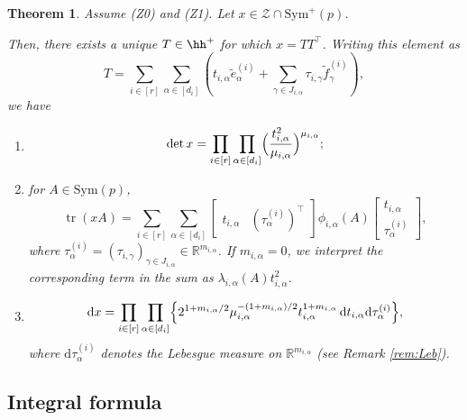 \documentclass[12pt]{amsart}
\theoremstyle{plain}
\newtheorem{theorem}{Theorem}[section]
\theoremstyle{definition}
\theoremstyle{remark}
\newcommand{\R}{\mathbb{R}}
\newcommand{\1}{\mathbf{1}}
\newcommand{\dd}{\mathrm{d}}
\newcommand{\tr}{\operatorname{tr}}
\newcommand{\mytransp}[1]{ #1^{\top}}
\begin{document}
\begin{theorem}\label{thm:new_Cholesky}
    Assume (Z0) and (Z1).  
Let $x \in \mathcal{Z} \cap \mathrm{Sym}^+(p)$.

Then, there exists a unique $T \in \hh^+$ for which $x = T \mytransp{T}$.
Writing this element as
\[
T = \sum_{i\in[r]} \sum_{\alpha\in[d_i]} (t_{i,\alpha} \tilde{e}^{(i)}_\alpha + \sum_{\gamma \in J_{i,\alpha}} \tau_{i,\gamma} \tilde{f}^{(i)}_\gamma ),
\]
we have 
\begin{enumerate}
    \item[(i)]    
\begin{align*}
  \det x
 = \prod_{i\in[r]} \prod_{\alpha\in[d_i]} 
 \Bigl( \frac{t_{i,\alpha}^2} {\mu_{i,\alpha} } \Bigr)^{\mu_{i,\alpha}};
    \end{align*}
    \item[(ii)] for $A\in\mathrm{Sym}(p)$, 
\begin{equation*}
 \tr(xA) =
\sum_{i\in[r]} \sum_{\alpha\in[d_i]} 
\begin{bmatrix} t_{i,\alpha} & (\tau_{\alpha}^{(i)})^\top \end{bmatrix}
\phi_{i,\alpha}(A)
\begin{bmatrix} t_{i,\alpha} \\ \tau_{\alpha}^{(i)} \end{bmatrix},
\end{equation*}
where $\tau_{\alpha}^{(i)}=(\tau_{i,\gamma})_{\gamma\in J_{i,\alpha}}\in \R^{m_{i,\alpha}}$.
If $m_{i,\alpha}=0$, we interpret the corresponding term in the sum as $\lambda_{i,\alpha}(A) t_{i,\alpha}^2$. 
 \item[(iii)] \begin{equation*} 
\begin{aligned}
\dd x = \prod_{i\in[r]} \prod_{\alpha\in[d_i]}
 \Bigl\{ 
2^{1 + m_{i,\alpha}/2} \mu_{i,\alpha}^{-(1+m_{i,\alpha})/2} t_{i,\alpha}^{1 + m_{i,\alpha}}
 \, \dd t_{i,\alpha} \dd\tau^{(i)}_\alpha
 \Bigr\},
\end{aligned}
\end{equation*}
where $\dd\tau^{(i)}_\alpha$ denotes the Lebesgue measure on $\R^{m_{i,\alpha}}$ (see Remark \ref{rem:Leb}). 
\end{enumerate}
\end{theorem}

\subsection{Integral formula}\label{sec:integral}
\end{document}
